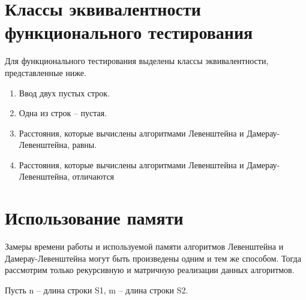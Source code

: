 
\clearpage

\section{Классы эквивалентности функционального тестирования}

Для функционального тестирования выделены классы эквивалентности, представленные ниже.

\begin{enumerate}
    \item Ввод двух пустых строк.
    \item Одна из строк -- пустая.
    \item Расстояния, которые вычислены алгоритмами Левенштейна и Дамерау-Левенштейна, равны.
    \item Расстояния, которые вычислены алгоритмами Левенштейна и Дамерау-Левенштейна, отличаются
\end{enumerate}

\section{Использование памяти}

Замеры времени работы и используемой памяти алгоритмов Левенштейна и Дамерау-Левенштейна могут быть произведены одним и тем же способом.
Тогда рассмотрим только рекурсивную и матричную реализации данных алгоритмов.

Пусть n -- длина строки S1, m -- длина строки S2.

